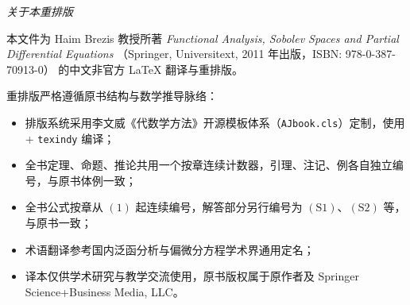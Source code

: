 \thispagestyle{empty}
\begin{center}
    \small
    \noindent\emph{关于本重排版}\\[0.6em]
    \parbox{0.86\textwidth}{
    本文件为 Haim Brezis 教授所著
    \emph{Functional Analysis, Sobolev Spaces and Partial Differential Equations}
    （Springer, Universitext, 2011 年出版，ISBN: 978-0-387-70913-0）
    的中文非官方 \LaTeX{} 翻译与重排版。
    \medskip

    重排版严格遵循原书结构与数学推导脉络：
    \begin{itemize}[leftmargin=2em, itemsep=0.2em]
      \item 排版系统采用李文威《代数学方法》开源模板体系（\texttt{AJbook.cls}）定制，使用  + \texttt{texindy} 编译；
      \item 全书定理、命题、推论共用一个按章连续计数器，引理、注记、例各自独立编号，与原书体例一致；
      \item 全书公式按章从 $(1)$ 起连续编号，解答部分另行编号为 $(\mathrm{S}1)$、$(\mathrm{S}2)$ 等，与原书一致；
      \item 术语翻译参考国内泛函分析与偏微分方程学术界通用定名；
      \item 译本仅供学术研究与教学交流使用，原书版权属于原作者及 Springer Science+Business Media, LLC。
    \end{itemize}
    }
\end{center}
\vfill
\clearpage
